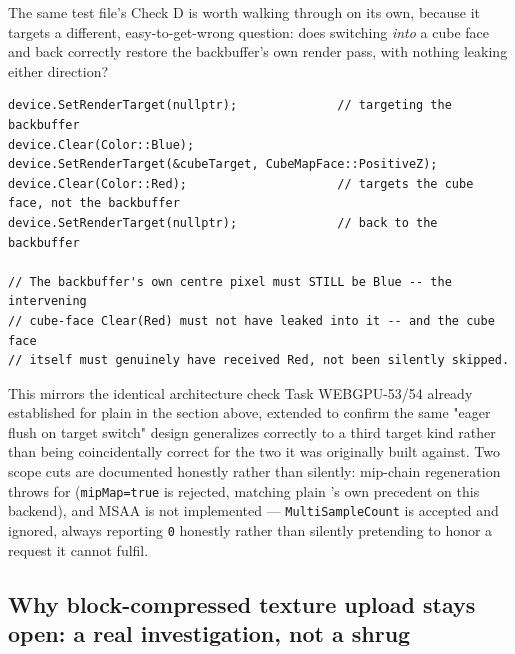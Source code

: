 The same test file's Check D is worth walking through on its own, because it targets a
different, easy-to-get-wrong question: does switching \emph{into} a cube face and back
correctly restore the backbuffer's own render pass, with nothing leaking either direction?

\begin{lstlisting}
device.SetRenderTarget(nullptr);              // targeting the backbuffer
device.Clear(Color::Blue);
device.SetRenderTarget(&cubeTarget, CubeMapFace::PositiveZ);
device.Clear(Color::Red);                     // targets the cube face, not the backbuffer
device.SetRenderTarget(nullptr);              // back to the backbuffer

// The backbuffer's own centre pixel must STILL be Blue -- the intervening
// cube-face Clear(Red) must not have leaked into it -- and the cube face
// itself must genuinely have received Red, not been silently skipped.
\end{lstlisting}

This mirrors the identical architecture check Task WEBGPU-53/54 already established for plain
 in the section above, extended to confirm the same "eager flush on
target switch" design generalizes correctly to a third target kind rather than being
coincidentally correct for the two it was originally built against. Two scope cuts are
documented honestly rather than silently: mip-chain regeneration throws for
 (\texttt{mipMap=true} is rejected, matching plain
's own precedent on this backend), and MSAA is not implemented ---
\texttt{MultiSampleCount} is accepted and ignored, always reporting \texttt{0} honestly rather
than silently pretending to honor a request it cannot fulfil.

\subsection{Why block-compressed texture upload stays open: a real investigation, not a shrug}

